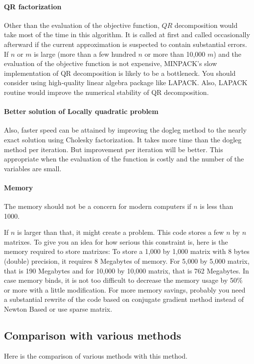 \documentclass[12pt]{article}
\begin{document}
\paragraph{QR factorization} 
Other than the evaluation of the objective function, $QR$ decomposition would take most of the
time in this algorithm. It is called at first and called occasionally afterward if the current
approximation is suspected to contain substantial errors. If $n$ or $m$ is large (more than a few
hundred $n$ or more than 10,000 $m$) and the evaluation of the objective function is not
expensive, MINPACK's slow implementation of QR decomposition is likely to be a bottleneck. You
should consider using high-quality linear algebra package like LAPACK. Also, LAPACK routine would
improve the numerical stability of QR decomposition. 

\paragraph{Better solution of Locally quadratic problem}
Also, faster speed can be attained by improving the dogleg method to the nearly exact solution
using Cholesky factorization. It takes more time than the dogleg method per iteration. But improvement
per iteration will be better. This appropriate when the evaluation of the function is costly and
the number of the variables are small.


\paragraph{Memory}
The memory should not be a concern for modern computers if $n$ is less than 1000. 

If $n$ is larger than that, it might create a problem. This code stores a few $n$ by $n$
matrixes. To give you an idea for how serious this constraint is, here is the memory required to
store matrixes: To store a 1,000 by 1,000 matrix with 8 bytes (double) precision, it requires 8
Megabytes of memory. For 5,000 by 5,000 matrix, that is 190 Megabytes and for 10,000 by 10,000
matrix, that is 762 Megabytes. In case memory binds, it is not too difficult to decrease the
memory usage by 50\% or more with a little modification. For more memory savings, probably you
need a substantial rewrite of the code based on conjugate gradient method instead of Newton Based or
use sparse matrix.


\subsection{Comparison with various methods}
Here is the comparison of various methods with this method. 
\end{document}
